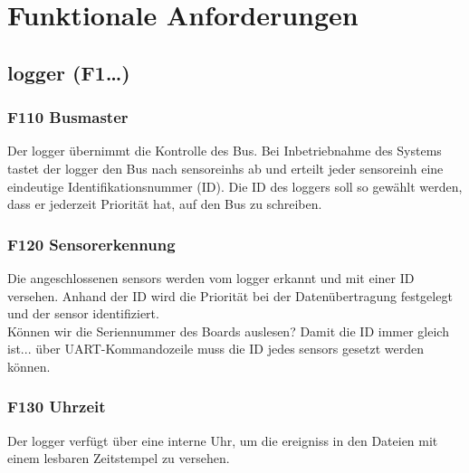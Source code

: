 %
%

\thispagestyle{empty}
\chapter{Funktionale Anforderungen}\label{chap.funktionale}
\section{\gls{logger} (F1\ldots)}


\subsection{F110 Busmaster}
Der \gls{logger} übernimmt die Kontrolle des Bus. Bei Inbetriebnahme des Systems tastet der \gls{logger} den Bus nach \glspl{sensoreinh} ab und erteilt jeder \gls{sensoreinh} eine eindeutige Identifikationsnummer (ID). Die ID des \gls{logger}s soll so gewählt werden, dass er jederzeit Priorität hat, auf den Bus zu schreiben.


\subsection{F120 Sensorerkennung}
Die angeschlossenen \glspl{sensor} werden vom \gls{logger} erkannt und mit einer ID versehen. Anhand der ID wird die Priorität bei der Datenübertragung festgelegt und der \gls{sensor} identifiziert.\\
Können wir die Seriennummer des Boards auslesen? Damit die ID immer gleich ist... über UART-Kommandozeile muss die ID jedes \gls{sensor}s gesetzt werden können.


\subsection{F130 Uhrzeit}
Der \gls{logger} verfügt über eine interne Uhr, um die \glspl{ereignis} in den Dateien mit einem lesbaren Zeitstempel zu versehen.


